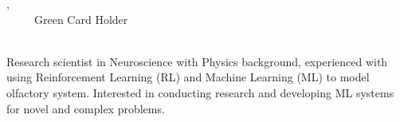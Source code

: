 \documentclass[letterpaper,11pt]{article}
\begin{document}
\nocite{*}

\begin{center}
  {\huge \myname, \mytitle}
  \\
  \vspace{2pt}
  \faMobile \enspace
  {\myphone} ~
  \textbullet
  \faEnvelope \enspace
  \href{mailto:\myemail}{\color{blue}{\myemail}} ~
  \textbullet
  \faHome \enspace
  {\mylocation} ~
  \textbullet
  \faMap \enspace
  {Green Card Holder}
  \\
  \faLinkedin \enspace
  \href{https://www.linkedin.com/in/\mylinkedin}{\color{blue}{\mylinkedin}} ~
  \textbullet
  \faGithub \enspace
  \href{https://github.com/\mygithub}{\color{blue}{\mygithub}} ~
  \textbullet
  \faTwitter \enspace
  \href{https://twitter.com/bbaserdem}{ \color{blue}{bbaserdem}}
  \vspace{-7pt}
\end{center}

\begin{center}
  Research scientist in Neuroscience with Physics background,
  experienced with using Reinforcement Learning (RL) and Machine
  Learning (ML) to model olfactory system.
  Interested in conducting research and developing ML systems for
  novel and complex problems.

\end{center}

\end{document}
